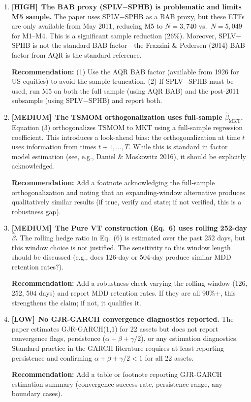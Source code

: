 \documentclass[12pt,a4paper]{article}
\newcommand{\HIGH}{\textcolor{highsev}{\textbf{[HIGH]}}}
\newcommand{\MEDIUM}{\textcolor{medsev}{\textbf{[MEDIUM]}}}
\newcommand{\LOW}{\textcolor{lowsev}{\textbf{[LOW]}}}
\begin{document}
\begin{enumerate}[label=\textbf{5.\arabic*}]

\item \HIGH\ \textbf{The BAB proxy (SPLV$-$SPHB) is problematic and limits M5 sample.}
The paper uses SPLV$-$SPHB as a BAB proxy, but these ETFs are only available from May 2011, reducing M5 to $N = 3{,}740$ vs.\ $N = 5{,}049$ for M1--M4. This is a significant sample reduction (26\%). Moreover, SPLV$-$SPHB is not the standard BAB factor---the Frazzini \& Pedersen (2014) BAB factor from AQR is the standard reference.

\textbf{Recommendation:} (1) Use the AQR BAB factor (available from 1926 for US equities) to avoid the sample truncation. (2) If SPLV$-$SPHB must be used, run M5 on both the full sample (using AQR BAB) and the post-2011 subsample (using SPLV$-$SPHB) and report both.

\item \MEDIUM\ \textbf{The TSMOM orthogonalization uses full-sample $\hat{\beta}_{\text{MKT}}$.}
Equation (3) orthogonalizes TSMOM to MKT using a full-sample regression coefficient. This introduces a look-ahead bias: the orthogonalization at time $t$ uses information from times $t+1, \ldots, T$. While this is standard in factor model estimation (see, e.g., Daniel \& Moskowitz 2016), it should be explicitly acknowledged.

\textbf{Recommendation:} Add a footnote acknowledging the full-sample orthogonalization and noting that an expanding-window alternative produces qualitatively similar results (if true, verify and state; if not verified, this is a robustness gap).

\item \MEDIUM\ \textbf{The Pure VT construction (Eq.~6) uses rolling 252-day $\hat{\beta}$.}
The rolling hedge ratio in Eq.~(6) is estimated over the past 252 days, but this window choice is not justified. The sensitivity to this window length should be discussed (e.g., does 126-day or 504-day produce similar MDD retention rates?).

\textbf{Recommendation:} Add a robustness check varying the rolling window (126, 252, 504 days) and report MDD retention rates. If they are all 90\%+, this strengthens the claim; if not, it qualifies it.

\item \LOW\ \textbf{No GJR-GARCH convergence diagnostics reported.}
The paper estimates GJR-GARCH(1,1) for 22 assets but does not report convergence flags, persistence ($\alpha + \beta + \gamma/2$), or any estimation diagnostics. Standard practice in the GARCH literature requires at least reporting persistence and confirming $\alpha + \beta + \gamma/2 < 1$ for all 22 assets.

\textbf{Recommendation:} Add a table or footnote reporting GJR-GARCH estimation summary (convergence success rate, persistence range, any boundary cases).

\end{enumerate}
\end{document}
